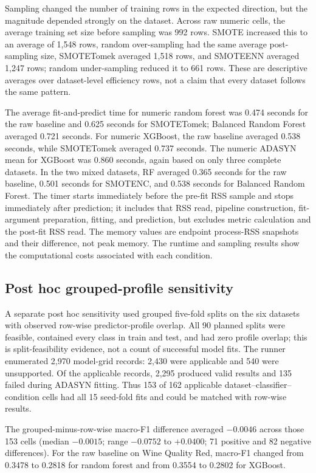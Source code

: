 \documentclass[10pt]{article}
\begin{document}
Sampling changed the number of training rows in the expected direction, but the magnitude depended strongly on the dataset. Across raw numeric cells, the average training set size before sampling was 992 rows. SMOTE increased this to an average of 1,548 rows, random over-sampling had the same average post-sampling size, SMOTETomek averaged 1,518 rows, and SMOTEENN averaged 1,247 rows; random under-sampling reduced it to 661 rows. These are descriptive averages over dataset-level efficiency rows, not a claim that every dataset follows the same pattern.

The average fit-and-predict time for numeric random forest was 0.474 seconds for the raw baseline and 0.625 seconds for SMOTETomek; Balanced Random Forest averaged 0.721 seconds. For numeric XGBoost, the raw baseline averaged 0.538 seconds, while SMOTETomek averaged 0.737 seconds. The numeric ADASYN mean for XGBoost was 0.860 seconds, again based on only three complete datasets. In the two mixed datasets, RF averaged 0.365 seconds for the raw baseline, 0.501 seconds for SMOTENC, and 0.538 seconds for Balanced Random Forest. The timer starts immediately before the pre-fit RSS sample and stops immediately after prediction; it includes that RSS read, pipeline construction, fit-argument preparation, fitting, and prediction, but excludes metric calculation and the post-fit RSS read. The memory values are endpoint process-RSS snapshots and their difference, not peak memory. The runtime and sampling results show the computational costs associated with each condition.

\subsection{Post hoc grouped-profile sensitivity}

A separate post hoc sensitivity used grouped five-fold splits on the six datasets with observed row-wise predictor-profile overlap. All 90 planned splits were feasible, contained every class in train and test, and had zero profile overlap; this is split-feasibility evidence, not a count of successful model fits. The runner enumerated 2,970 model-grid records: 2,430 were applicable and 540 were unsupported. Of the applicable records, 2,295 produced valid results and 135 failed during ADASYN fitting. Thus 153 of 162 applicable dataset--classifier--condition cells had all 15 seed-fold fits and could be matched with row-wise results.

The grouped-minus-row-wise macro-F1 difference averaged $-0.0046$ across those 153 cells (median $-0.0015$; range $-0.0752$ to $+0.0400$; 71 positive and 82 negative differences). For the raw baseline on Wine Quality Red, macro-F1 changed from 0.3478 to 0.2818 for random forest and from 0.3554 to 0.2802 for XGBoost.
\end{document}
